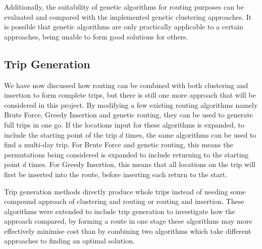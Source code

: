 Additionally, the suitability of genetic algorithms for routing purposes can be evaluated and compared with the
implemented genetic clustering approaches.
It is possible that genetic algorithms are only practically applicable to a certain approaches, being unable to form
good solutions for others.

\subsection{Trip Generation}\label{subsec:trip-generation}
We have now discussed how routing can be combined with both clustering and insertion to form complete trips, but
there is still one more approach that will be considered in this project.
By modifying a few existing routing algorithms namely Brute Force, Greedy Insertion and genetic routing, they can be
used to generate full trips in one go.
If the locations input for these algorithms is expanded, to include the starting point of the trip $d$ times, the same
algorithms can be used to find a multi-day trip.
For Brute Force and genetic routing, this means the permutations being considered is expanded to include returning to
the starting point $d$ times.
For Greedy Insertion, this means that all locations on the trip will first be inserted into the route, before inserting
each return to the start.

Trip generation methods directly produce whole trips instead of needing some compound approach of clustering
and routing or routing and insertion.
These algorithms were extended to include trip generation to investigate how the approach compared, by
forming a route in one stage these algorithms may more effectively minimise cost than by combining two algorithms which
take different approaches to finding an optimal solution.